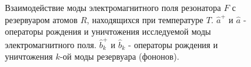 \begin{figure}
\centering



\caption{Взаимодействие моды электромагнитного поля резонатора $F$ с
  резервуаром атомов $R$, находящихся при температуре $T$. $\hat{a}^{+}$ и
$\hat{a}$ - операторы рождения и уничтожения исследуемой моды
электромагнитного поля. $\hat{b}_k^{+}$ и
$\hat{b}_k$ - операторы рождения и уничтожения $k$-ой моды резервуара (фононов).}
\label{figPart1Ch2_add3}
\end{figure}
